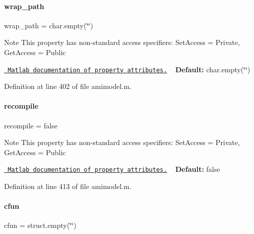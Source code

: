 \paragraph{\texorpdfstring{wrap\_path}{wrap\_path}}
{\footnotesize\ttfamily wrap\+\_\+path = char.\+empty(\char`\"{}\char`\"{})}

\begin{DoxyNote}{Note}
This property has non-\/standard access specifiers\+: {\ttfamily Set\+Access = Private, Get\+Access = Public} 

\href{http://www.mathworks.com/help/matlab/matlab_oop/property-attributes.html}{\texttt{ Matlab documentation of property attributes.}} ~\newline
{\bfseries{Default\+:}} char.\+empty(\char`\"{}\char`\"{}) 
\end{DoxyNote}


Definition at line 402 of file amimodel.\+m.

\mbox{\label{classamimodel_a8d2e824e03e32034b634a7c48f2a26c6}} 
\paragraph{\texorpdfstring{recompile}{recompile}}
{\footnotesize\ttfamily recompile = false}

\begin{DoxyNote}{Note}
This property has non-\/standard access specifiers\+: {\ttfamily Set\+Access = Private, Get\+Access = Public} 

\href{http://www.mathworks.com/help/matlab/matlab_oop/property-attributes.html}{\texttt{ Matlab documentation of property attributes.}} ~\newline
{\bfseries{Default\+:}} false 
\end{DoxyNote}


Definition at line 413 of file amimodel.\+m.

\mbox{\label{classamimodel_afec809c626a350367485aa6aaea6b585}} 
\paragraph{\texorpdfstring{cfun}{cfun}}
{\footnotesize\ttfamily cfun = struct.\+empty(\char`\"{}\char`\"{})}

